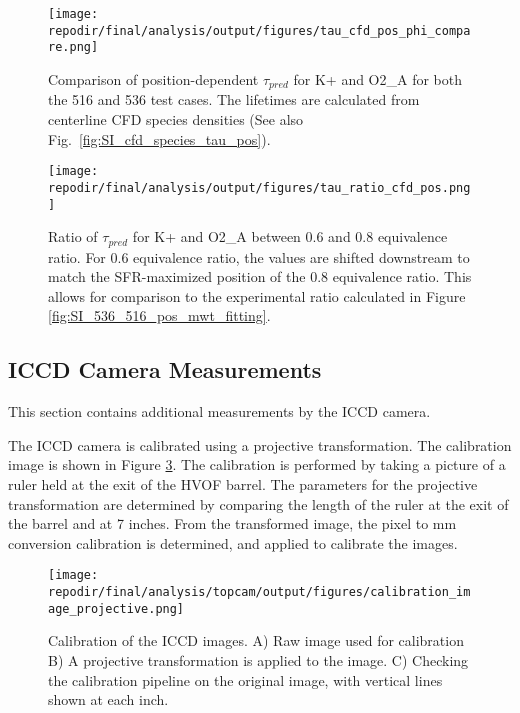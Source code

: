 \begin{figure}[]
\centering
\texttt{[image: \\repodir/final/analysis/output/figures/tau\_cfd\_pos\_phi\_compare.png]}
\caption{Comparison of position-dependent $\tau_{pred}$ for K+ and O2\_A for both the 516 and 536 test cases. The lifetimes are calculated from centerline CFD species densities (See also Fig.\ \ref{fig:SI_cfd_species_tau_pos}).}
\label{fig:SI_tau_cfd_pos_phi_compare}
\end{figure}



\begin{figure}[]
\centering
\texttt{[image: \\repodir/final/analysis/output/figures/tau\_ratio\_cfd\_pos.png]}
\caption{Ratio of $\tau_{pred}$ for K+ and O2\_A between 0.6 and 0.8 equivalence ratio. For 0.6 equivalence ratio, the values are shifted downstream to match the SFR-maximized position of the 0.8 equivalence ratio. This allows for comparison to the experimental ratio calculated in Figure \ref{fig:SI_536_516_pos_mwt_fitting}.}
\label{fig:SI_tau_ratio_cfd_pos}
\end{figure}

\clearpage
\subsection{ICCD Camera Measurements}

This section contains additional measurements by the ICCD camera. 

The ICCD camera is calibrated using a projective transformation. The calibration image is shown in Figure \ref{fig:SI_iccd_calibration}. The calibration is performed by taking a picture of a ruler held at the exit of the HVOF barrel. The parameters for the projective transformation are determined by comparing the length of the ruler at the exit of the barrel and at 7 inches. From the transformed image, the pixel to mm conversion calibration is determined, and applied to calibrate the images. 

\begin{figure}[]
\centering
\texttt{[image: \\repodir/final/analysis/topcam/output/figures/calibration\_image\_projective.png]}
\caption{Calibration of the ICCD images. A) Raw image used for calibration B) A projective transformation is applied to the image. C) Checking the calibration pipeline on the original image, with vertical lines shown at each inch.}
\label{fig:SI_iccd_calibration}
\end{figure}


